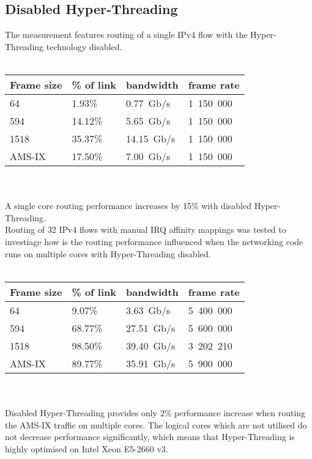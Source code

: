
\subsection{Disabled Hyper-Threading}
The measurement features routing of a single IPv4 flow with the Hyper-Threading technology disabled.
\\
\\
\begin{tabular}{ | l | l | l | l | }
\hline
Frame size & \% of link & bandwidth & frame rate \\
\hline
64     &  1.93\% &  0.77~Gb/s & 1~150~000 \\
594    & 14.12\% &  5.65~Gb/s & 1~150~000 \\
1518   & 35.37\% & 14.15~Gb/s & 1~150~000 \\
AMS-IX & 17.50\% &  7.00~Gb/s & 1~150~000 \\
\hline
\end{tabular}
\\
\\
A single core routing performance increases by 15\% with disabled Hyper-Threading.
\\
Routing of 32 IPv4 flows with manual IRQ affinity mappings was tested to investiage
how is the routing performance influenced when the networking code runs
on multiple cores with Hyper-Threading disabled.
\\
\\
\begin{tabular}{ | l | l | l | l | }
\hline
Frame size & \% of link & bandwidth & frame rate \\
\hline
64     &  9.07\% &  3.63~Gb/s & 5~400~000 \\
594    & 68.77\% & 27.51~Gb/s & 5~600~000 \\
1518   & 98.50\% & 39.40~Gb/s & 3~202~210 \\
AMS-IX & 89.77\% & 35.91~Gb/s & 5~900~000 \\
\hline
\end{tabular}
\\
\\
Disabled Hyper-Threading provides only 2\% performance increase when routing the AMS-IX traffic on multiple cores.
The logical cores which are not utilised do not decrease performance significantly,
which means that Hyper-Threading is highly optimised on Intel Xeon E5-2660 v3.
